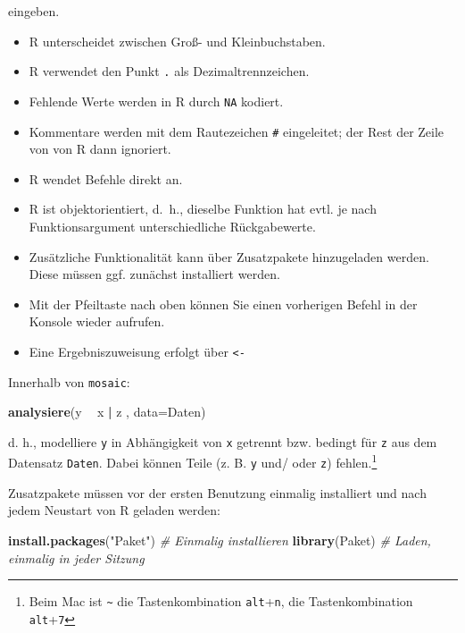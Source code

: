 \documentclass[12pt,ngerman,paper=a4,pagesize,DIV=13]{scrreprt}
\newenvironment{Shaded}{\begin{snugshade}}{\end{snugshade}}
\newcommand{\CommentTok}[1]{\textcolor[rgb]{0.56,0.35,0.01}{\textit{#1}}}
\newcommand{\DataTypeTok}[1]{\textcolor[rgb]{0.13,0.29,0.53}{#1}}
\newcommand{\KeywordTok}[1]{\textcolor[rgb]{0.13,0.29,0.53}{\textbf{#1}}}
\newcommand{\NormalTok}[1]{#1}
\newcommand{\OperatorTok}[1]{\textcolor[rgb]{0.81,0.36,0.00}{\textbf{#1}}}
\newcommand{\StringTok}[1]{\textcolor[rgb]{0.31,0.60,0.02}{#1}}
\providecommand{\tightlist}{%
  \setlength{\itemsep}{0pt}\setlength{\parskip}{0pt}}
\begin{document}
eingeben.

\begin{itemize}
\tightlist
\item
  R unterscheidet zwischen Groß- und Kleinbuchstaben.
\item
  R verwendet den Punkt \texttt{.} als Dezimaltrennzeichen.
\item
  Fehlende Werte werden in R durch \texttt{NA} kodiert.
\item
  Kommentare werden mit dem Rautezeichen \texttt{\#} eingeleitet; der
  Rest der Zeile von von R dann ignoriert.
\item
  R wendet Befehle direkt an.
\item
  R ist objektorientiert, d.~h., dieselbe Funktion hat evtl. je nach
  Funktionsargument unterschiedliche Rückgabewerte.
\item
  Zusätzliche Funktionalität kann über Zusatzpakete hinzugeladen werden.
  Diese müssen ggf. zunächst installiert werden.
\item
  Mit der Pfeiltaste nach oben können Sie einen vorherigen Befehl in der
  Konsole wieder aufrufen.
\item
  Eine Ergebniszuweisung erfolgt über \texttt{\textless{}-}
\end{itemize}

Innerhalb von \texttt{mosaic}:

\begin{Shaded}
\begin{Highlighting}[]
\KeywordTok{analysiere}\NormalTok{(y }\OperatorTok{~}\StringTok{ }\NormalTok{x }\OperatorTok{|}\StringTok{ }\NormalTok{z , }\DataTypeTok{data=}\NormalTok{Daten)}
\end{Highlighting}
\end{Shaded}

d. h., modelliere \texttt{y} in Abhängigkeit von \texttt{x} getrennt
bzw. bedingt für \texttt{z} aus dem Datensatz \texttt{Daten}. Dabei
können Teile (z. B. \texttt{y} und/ oder \texttt{z}) fehlen.\footnote{Beim
  Mac ist \texttt{\textasciitilde{}} die Tastenkombination
  \texttt{alt}+\texttt{n}, \texttt{\textbar{}} die Tastenkombination
  \texttt{alt}+\texttt{7}}

Zusatzpakete müssen vor der ersten Benutzung einmalig installiert und
nach jedem Neustart von R geladen werden:

\begin{Shaded}
\begin{Highlighting}[]
\KeywordTok{install.packages}\NormalTok{(}\StringTok{"Paket"}\NormalTok{) }\CommentTok{# Einmalig installieren}
\KeywordTok{library}\NormalTok{(Paket) }\CommentTok{# Laden, einmalig in jeder Sitzung}
\end{Highlighting}
\end{Shaded}
\end{document}
